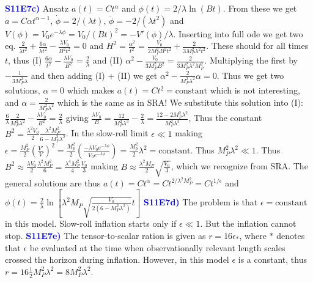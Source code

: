 \documentclass[landscape, a4paper,1pt,english]{article}
\begin{document}
{{{\begin{multicols}{5}
\textcolor{blue}{\textbf{S11E7c)}} Ansatz $a(t) = Ct^\alpha$ and $\phi(t) = 2/\lambda \ln(Bt)$. From these we get $\dot{a} = C\alpha t^{\alpha - 1}$, $\dot{\phi} = 2/(\lambda t)$, $\ddot{\phi} = -2/(\lambda t^2)$ and $V(\phi) = V_0 e^{-\lambda\phi} = V_0/(Bt)^2 = -V'(\phi)/\lambda$. Inserting into full ode we get two eq. $\frac{2}{\lambda t^2} + \frac{6\alpha}{\lambda t^2} - \frac{\lambda V_0}{B^2t^2} = 0$ and $H^2 = \frac{\alpha^2}{t^2} = \frac{V_0}{2M_P^2 B^2t^2} + \frac{2}{3M_P^2\lambda^2 t^2}$. These should for all times $t$, thus 
(I) $\frac{6\alpha}{t^2} - \frac{\lambda V_0}{B^2} = \frac{2}{\lambda}$ and (II) $\alpha^2 - \frac{V_0}{3M_P^2B^2} = \frac{2}{3M_P^2 \lambda^2M_P^2}$. Multiplying the first by $-\frac{1}{3M_P^2\lambda}$ and then adding (I) + (II) we get $\alpha^2 - \frac{2}{M_P^2\lambda^2}\alpha = 0$. Thus we get two solutions, $\alpha = 0$ which makes $a(t) = Ct^2 = \text{constant}$ which is not interesting, and $\alpha = \frac{2}{M_P^2\lambda^2}$ which is the same as in SRA! We substitute this solution into (I): $\frac{6}{\lambda}\frac{2}{M_P^2\lambda^2} - \frac{\lambda V_0}{B^2} = \frac{2}{\lambda}$ giving 
$\frac{\lambda V_0}{B} = \frac{12}{M_P^2\lambda^3} - \frac{2}{\lambda} = \frac{12 - 2M_P^2\lambda^2}{M_P^2\lambda^3}$, Thus the constant $B^2 = \frac{\lambda^2 V_0}{2}\frac{\lambda^2M_P^2}{6-M_P^2\lambda^2}$. In the slow-roll limit $\epsilon\ll 1$ making $\epsilon = \frac{M_P^2}{2}\left(\frac{V'}{V}\right)^2 = \frac{M_p^2}{2}\left(\frac{-\lambda V_0 e^{-\lambda\phi}}{V_0 e^{-\lambda\phi}}\right) = \frac{M_p^2}{2}\lambda^2 = \text{constant}$. Thus $M_P^2\lambda^2 \ll 1$. Thus $B^2 \approx \frac{\lambda V_0}{2}\frac{\lambda^2M_P^2}{6} = \frac{\lambda^4M_P^2}{4}\frac{V_0}{3}$ making $B\approx \frac{\lambda^2M_P}{2}\sqrt{\frac{V_0}{3}}$, which we recognize from SRA. The general solutions are thus 
$a(t) = Ct^\alpha = Ct^{2/\lambda^2M_P^2} = Ct^{1/\epsilon}$ and $\phi(t) = \frac{2}{\lambda}\ln\left[\lambda^2 M_P\sqrt{\frac{V_0}{2(6-M_P^2\lambda^2)}}t\right]$
\textcolor{blue}{\textbf{S11E7d)}} The problem is that $\epsilon = \text{constant}$ in this model. Slow-roll inflation starts only if $\epsilon \ll 1$. But the inflation cannot stop.
\textcolor{blue}{\textbf{S11E7e)}}
The tensor-to-scalar ration is given as 
$r = 16 \epsilon_*$, where $*$ denotes that $\epsilon$ be evaluated at the time when observationally relevant length scales crossed the horizon during inflation. However, in this model $\epsilon$ is a constant, thus $r = 16 \frac{1}{2}M_P^2\lambda^2 = 8M_P^2\lambda^2$.
\end{multicols}
} } }
\end{document}
